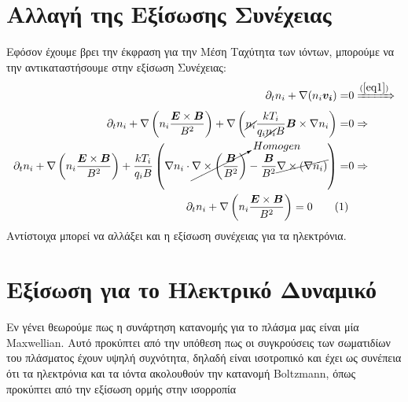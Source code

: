 \documentclass[a4paper]{article}
\newcommand\numberthis{\addtocounter{equation}{1}\tag{\theequation}}
\begin{document}
	  \section*{Αλλαγή της Εξίσωσης Συνέχειας}
	  Εφόσον έχουμε βρει την έκφραση για την Μέση Ταχύτητα των ιόντων, μπορούμε να την αντικαταστήσουμε στην εξίσωση Συνέχειας: 
	  	\begin{align*}\label{eq3}
	  		\partial_t n_i + \nabla(n_i\bm{v_i}) =& 0 \xRightarrow{(\ref{eq1})}\\
	  		\partial_t n_i + \nabla\left(n_i \frac{\bm{E}\times\bm{B}}{B^2}\right) + \nabla\left( \cancel{n_i}\frac{kT_i}{q_i\cancel{n_i}B}\bm{B}\times\nabla n_i\right)=&0\Rightarrow\\ 		
	  		\partial_tn_i  + \nabla\left(n_i \frac{\bm{E}\times\bm{B}}{B^2}\right) + \frac{kT_i}{q_iB}\left( \nabla n_i\cdot\cancelto{Homogen}{\nabla\times\left(\frac{\bm{B}}{B^2}\right)}-\frac{\bm{B}}{B^2}\cancel{\nabla\times(\nabla n_i)}\right)=&0\Rightarrow\\
	  		\partial_tn_i + \nabla\left(n_i \frac{\bm{E}\times\bm{B}}{B^2}\right)=0 \numberthis
	  	\end{align*}
	  	Αντίστοιχα μπορεί να αλλάξει και η εξίσωση συνέχειας για τα ηλεκτρόνια.
	  \section*{Εξίσωση για το Ηλεκτρικό Δυναμικό}
	  
	  Εν γένει θεωρούμε πως η συνάρτηση κατανομής για το πλάσμα μας είναι μία Maxwellian. Αυτό προκύπτει από την υπόθεση πως οι συγκρούσεις των σωματιδίων του πλάσματος έχουν υψηλή συχνότητα, δηλαδή είναι ισοτροπικό και έχει ως συνέπεια ότι τα ηλεκτρόνια και τα ιόντα ακολουθούν την κατανομή Boltzmann, όπως προκύπτει από την εξίσωση ορμής στην ισορροπία
\end{document}
